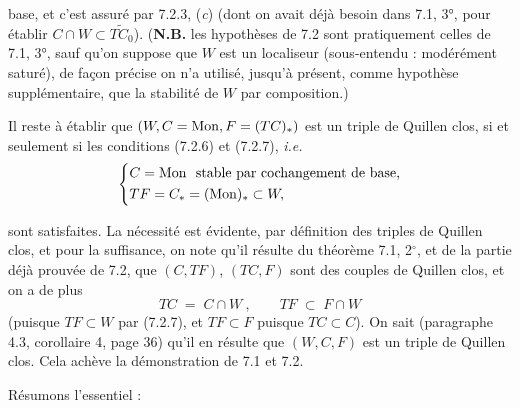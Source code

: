 base, et c'est assuré par 7.2.3, (\textit{c}) (dont on avait déjà besoin dans 7.1, 3°, pour établir $C \cap W \subset \widetilde{TC_0}$). (\textbf{N.B.} les hypothèses de 7.2 sont pratiquement celles de 7.1, 3°, sauf qu'on suppose que $W$ est un localiseur (sous-entendu : modérément saturé), de façon précise on n'a utilisé, jusqu'à présent, comme hypothèse supplémentaire, que la stabilité de $W$ par composition.)

Il reste à établir que $(W, C = \mathrm{Mon}, F = (TC)_*)$ est un triple de Quillen clos, si et seulement si les conditions (7.2.6) et (7.2.7), \textit{i.e.}
\[
\left\{
\begin{aligned}
& C = \mathrm{Mon} \ \ \text{stable par cochangement de base,} \\
& TF = C_* = (\mathrm{Mon})_* \subset W,
\end{aligned}
\right.
\]

sont satisfaites. La nécessité est évidente, par définition des triples de Quillen clos, et pour la suffisance, on note qu'il résulte du théorème 7.1, 2$^\circ$, et de la partie déjà prouvée de 7.2, que $(C,TF)$, $(TC,F)$ sont des couples de Quillen clos, et on a de plus
\[
TC \;=\; C\cap W\ , \qquad TF \;\subset\; F\cap W
\]
(puisque $TF\subset W$ par (7.2.7), et $TF\subset F$ puisque $TC\subset C$). On sait
(paragraphe 4.3, corollaire 4, page 36) qu'il en résulte que $(W,C,F)$ est un triple de Quillen clos. Cela achève la démonstration de 7.1 et 7.2.

Résumons l'essentiel :

